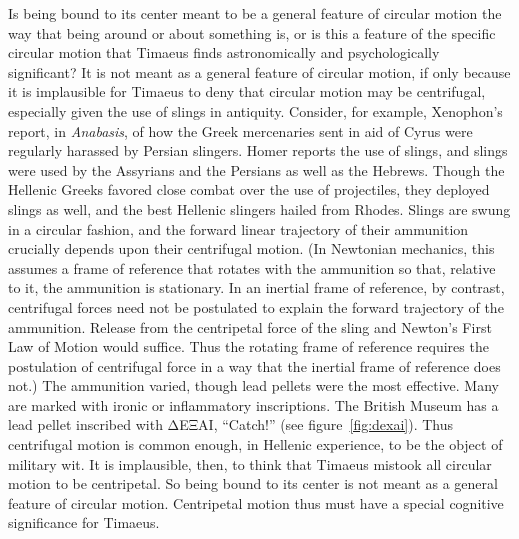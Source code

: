 Is being bound to its center meant to be a general feature of circular motion the way that being around or about something is, or is this a feature of the specific circular motion that Timaeus finds astronomically and psychologically significant? It is not meant as a general feature of circular motion, if only because it is implausible for Timaeus to deny that circular motion may be centrifugal, especially given the use of slings in antiquity. Consider, for example, Xenophon's report, in \emph{Anabasis}, of how the Greek mercenaries sent in aid of Cyrus were regularly harassed by Persian slingers. Homer reports the use of slings, and slings were used by the Assyrians and the Persians as well as the Hebrews. Though the Hellenic Greeks favored close combat over the use of projectiles, they deployed slings as well, and the best Hellenic slingers hailed from Rhodes. Slings are swung in a circular fashion, and the forward linear trajectory of their ammunition crucially depends upon their centrifugal motion. (In Newtonian mechanics, this assumes a frame of reference that rotates with the ammunition so that, relative to it, the ammunition is stationary. In an inertial frame of reference, by contrast, centrifugal forces need not be postulated to explain the forward trajectory of the ammunition. Release from the centripetal force of the sling and Newton's First Law of Motion would suffice. Thus the rotating frame of reference requires the postulation of centrifugal force in a way that the inertial frame of reference does not.) The ammunition varied, though lead pellets were the most effective. Many are marked with ironic or inflammatory inscriptions. The British Museum has a lead pellet inscribed with {\sbl ΔΕΞΑΙ}, ``Catch!'' (see figure~\ref{fig:dexai}). Thus centrifugal motion is common enough, in Hellenic experience, to be the object of military wit. It is implausible, then, to think that Timaeus mistook all circular motion to be centripetal. So being bound to its center is not meant as a general feature of circular motion. Centripetal motion thus must have a special cognitive significance for Timaeus.

